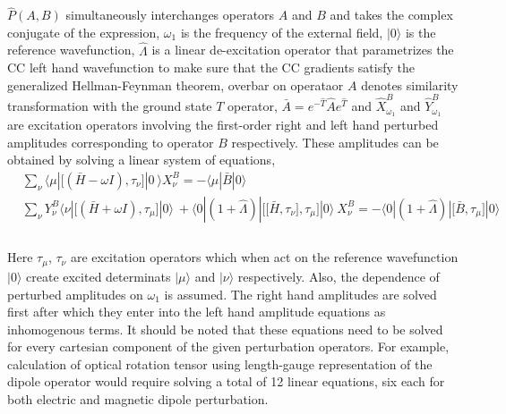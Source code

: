 $\hat{P}(A,B)$ simultaneously interchanges operators $A$ and $B$
and takes the complex conjugate of the expression,
$\omega_1$ is the frequency of the external field, 
$|0\rangle$ is the reference wavefunction, $\hat{\Lambda}$ is 
a linear de-excitation operator that parametrizes the CC left hand 
wavefunction to make sure that the CC gradients satisfy the 
generalized Hellman-Feynman theorem\cite{},
overbar on operataor $A$ denotes similarity transformation with the ground state
$T$ operator, $\bar{A} = e^{-\hat{T}}\hat{A}e^{\hat{T}}$
and $\hat{X}^{B}_{\omega_1}$ and $\hat{Y}^{B}_{\omega_1}$ are excitation operators involving 
the first-order right and left hand perturbed amplitudes corresponding to operator 
$B$ respectively. These amplitudes can be obtained by solving a linear system
of equations,
\\
\begin{equation}
\begin{split}
&\sum_\nu\langle \mu | \big[(\bar{H} - \omega I),\tau_\nu\big] |0 \
\rangle X_{\nu}^{B} = -\langle \mu|\bar{B}|0 \rangle \\
&\sum_\nu Y_{\nu}^{B}\langle \nu | \big[(\bar{H} + \omega I),\tau_\mu\big] |0 \rangle \
+ \langle 0|(1 + \hat{\Lambda})|\big[\big[\bar{H},\tau_\nu\big],\tau_\mu\big] |0 \rangle\  X_{\nu}^{B}
= -\langle 0|(1 + \hat{\Lambda})|\big[\bar{B},\tau_\mu\big] |0 \rangle \\
\end{split}
\end{equation}
\\
Here $\tau_\mu$, $\tau_\nu$ are excitation operators which when act on the
reference wavefunction $|0\rangle$ create excited determinats $|\mu\rangle$ 
and $|\nu\rangle$ respectively. Also, the dependence of perturbed amplitudes
 on $\omega_1$ is assumed. The right hand amplitudes are solved first after 
which they enter into the left hand amplitude equations as inhomogenous terms. 
It should be noted that these equations need to be solved for every cartesian 
component of the given perturbation operators. For example, calculation of 
optical rotation tensor using length-gauge representation of the dipole 
operator would require solving a total of 12 linear equations, six each 
for both electric and magnetic dipole perturbation.
